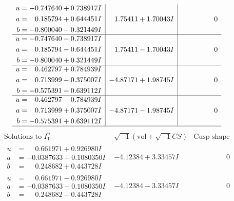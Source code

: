 \documentclass[1p]{elsarticle_modified}
\theoremstyle{definition}
\newcommand{\I}{\sqrt{-1}}
\begin{document}
$$\begin{array}{c|c|c}
\begin{aligned}
u &= -0.747640 + 0.738917 I \\
a &= \phantom{-}0.185794 + 0.644451 I \\
b &= -0.800040 - 0.321449 I\end{aligned}
 & \phantom{-}1.75411 + 1.70043 I & \phantom{-0.000000 } 0 \\ \hline\begin{aligned}
u &= -0.747640 - 0.738917 I \\
a &= \phantom{-}0.185794 - 0.644451 I \\
b &= -0.800040 + 0.321449 I\end{aligned}
 & \phantom{-}1.75411 - 1.70043 I & \phantom{-0.000000 } 0 \\ \hline\begin{aligned}
u &= \phantom{-}0.462797 + 0.784939 I \\
a &= \phantom{-}0.713999 - 0.375007 I \\
b &= -0.575391 - 0.639112 I\end{aligned}
 & -4.87171 + 1.98745 I & \phantom{-0.000000 } 0 \\ \hline\begin{aligned}
u &= \phantom{-}0.462797 - 0.784939 I \\
a &= \phantom{-}0.713999 + 0.375007 I \\
b &= -0.575391 + 0.639112 I\end{aligned}
 & -4.87171 - 1.98745 I & \phantom{-0.000000 } 0\\
 \hline 
 \end{array}$$\newpage$$\begin{array}{c|c|c}  
\text{Solutions to }I^u_{1}& \I (\text{vol} + \sqrt{-1}CS) & \text{Cusp shape}\\
 \hline 
\begin{aligned}
u &= \phantom{-}0.661971 + 0.926980 I \\
a &= -0.0387633 + 0.1080350 I \\
b &= \phantom{-}0.248682 + 0.443728 I\end{aligned}
 & -4.12384 + 3.33457 I & \phantom{-0.000000 } 0 \\ \hline\begin{aligned}
u &= \phantom{-}0.661971 - 0.926980 I \\
a &= -0.0387633 - 0.1080350 I \\
b &= \phantom{-}0.248682 - 0.443728 I\end{aligned}
 & -4.12384 - 3.33457 I & \phantom{-0.000000 } 0 \\ \hline\begin{aligned}

\end{aligned}
\end{array}$$
\end{document}
